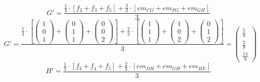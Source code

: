 \documentclass{article}
\begin{document}
\[G'=\frac{\frac{1}{3}\cdot\left[f_2+f_3+f_5\right]+
\frac{2}{3}\cdot\left[em_{CG}+em_{FG}+em_{GH}\right]
}{3}\]
\[G'=\frac{\frac{1}{3}\cdot\left[
\left({\begin{array}{c} 1 \\  0 \\ 1 \end{array}}\right)+
\left({\begin{array}{c} 0 \\  1 \\ 1 \end{array}}\right)+
\left({\begin{array}{c} 0 \\  0 \\ 2 \end{array}}\right)\right]+
\frac{2}{3}\cdot\left[
\left({\begin{array}{c} 1 \\  1 \\ 1 \end{array}}\right)+
\left({\begin{array}{c} 1 \\  0 \\ 2 \end{array}}\right)+
\left({\begin{array}{c} 0 \\  1 \\ 2 \end{array}}\right)\right]
}{3}=\left({\begin{array}{c} \frac{5}{9} \\  \frac{5}{9} \\ \frac{14}{9} \end{array}}\right)\]
\[H'=\frac{\frac{1}{3}\cdot\left[f_3+f_4+f_5\right]+
\frac{2}{3}\cdot\left[em_{DH}+em_{GH}+em_{HE}\right]
}{3}\]
\end{document}
